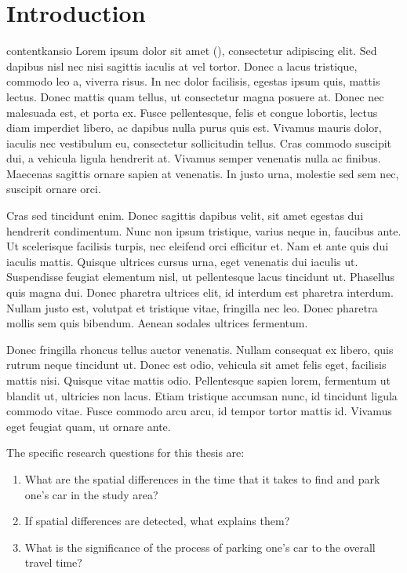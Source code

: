 \section{Introduction}
\justify
contentkansio Lorem ipsum dolor sit amet (\cite{Geurs2004}), consectetur adipiscing elit. Sed dapibus nisl nec nisi sagittis iaculis at vel tortor. Donec a lacus tristique, commodo leo a, viverra risus. In nec dolor facilisis, egestas ipsum quis, mattis lectus. Donec mattis quam tellus, ut consectetur magna posuere at. Donec nec malesuada est, et porta ex. Fusce pellentesque, felis et congue lobortis, lectus diam imperdiet libero, ac dapibus nulla purus quis est. Vivamus mauris dolor, iaculis nec vestibulum eu, consectetur sollicitudin tellus. Cras commodo suscipit dui, a vehicula ligula hendrerit at. Vivamus semper venenatis nulla ac finibus. Maecenas sagittis ornare sapien at venenatis. In justo urna, molestie sed sem nec, suscipit ornare orci.

Cras sed tincidunt enim. Donec sagittis dapibus velit, sit amet egestas dui hendrerit condimentum. Nunc non ipsum tristique, varius neque in, faucibus ante. Ut scelerisque facilisis turpis, nec eleifend orci efficitur et. Nam et ante quis dui iaculis mattis. Quisque ultrices cursus urna, eget venenatis dui iaculis ut. Suspendisse feugiat elementum nisl, ut pellentesque lacus tincidunt ut. Phasellus quis magna dui. Donec pharetra ultrices elit, id interdum est pharetra interdum. Nullam justo est, volutpat et tristique vitae, fringilla nec leo. Donec pharetra mollis sem quis bibendum. Aenean sodales ultrices fermentum.

Donec fringilla rhoncus tellus auctor venenatis. Nullam consequat ex libero, quis rutrum neque tincidunt ut. Donec est odio, vehicula sit amet felis eget, facilisis mattis nisi. Quisque vitae mattis odio. Pellentesque sapien lorem, fermentum ut blandit ut, ultricies non lacus. Etiam tristique accumsan nunc, id tincidunt ligula commodo vitae. Fusce commodo arcu arcu, id tempor tortor mattis id. Vivamus eget feugiat quam, ut ornare ante.

The specific research questions for this thesis are:

\begin{spacing}{1}
\begin{enumerate}[label=\Roman*] %
  \item What are the spatial differences in the time that it takes to find and park one’s car in the study area?
  \item If spatial differences are detected, what explains them?
  \item What is the significance of the process of parking one’s car to the overall travel time?
\end{enumerate}
\end{spacing}
